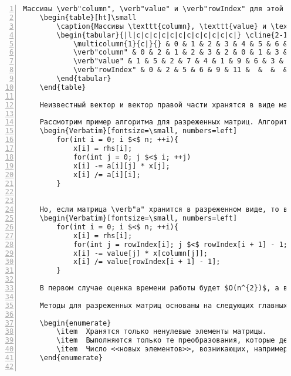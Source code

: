 \documentclass[bachelor, och, pract]{SCWorks}
\begin{document}
\begin{Verbatim}[fontsize=\small, numbers=left]
	Массивы \verb"column", \verb"value" и \verb"rowIndex" для этой матрицы представлены в таблице~\ref{tab:mat-arrays}.
	\begin{table}[ht]\small
		\caption{Массивы \texttt{column}, \texttt{value} и \texttt{rowIndex}}\label{tab:mat-arrays}
		\begin{tabular}{|l|c|c|c|c|c|c|c|c|c|c|c|c|} \cline{2-13}
			\multicolumn{1}{c|}{} & 0 & 1 & 2 & 3 & 4 & 5 & 6 & 7 & 8 & 9 & 10 & 11 \\ \cline{2-13}\hline
			\verb"column" & 0 & 2 & 1 & 2 & 3 & 2 & 0 & 1 & 3 & 2 & 4 &  \\ \hline\hline
			\verb"value" & 1 & 5 & 2 & 7 & 4 & 1 & 9 & 6 & 3 & 3 & 5 &  \\ \hline\hline
			\verb"rowIndex" & 0 & 2 & 5 & 6 & 9 & 11 &  &  &  &  &  &  \\ \hline
		\end{tabular}
	\end{table}
	
	Неизвестный вектор и вектор правой части хранятся в виде массивов размера $n$. Массив неизвестного вектора обозначают \verb"x", а массив правой части "--- \verb"rhs".
	
	Рассмотрим пример алгоритма для разреженных матриц. Алгоритм решения СЛАУ, представленной нижнетреугольной матрицей \verb"a", можно реализовать двумя вложенными циклами по \verb"n":
	\begin{Verbatim}[fontsize=\small, numbers=left]
		for(int i = 0; i $<$ n; ++i){
			x[i] = rhs[i];
			for(int j = 0; j $<$ i; ++j)
			x[i] -= a[i][j] * x[j];
			x[i] /= a[i][i];
		}

	
	Но, если матрица \verb"a" хранится в разреженном виде, то в данном алгоритме можно проходить только по ненулевым элементам \verb"a":
	\begin{Verbatim}[fontsize=\small, numbers=left]
		for(int i = 0; i $<$ n; ++i){
			x[i] = rhs[i];
			for(int j = rowIndex[i]; j $<$ rowIndex[i + 1] - 1; ++j)
			x[i] -= value[j] * x[column[j]];
			x[i] /= value[rowIndex[i + 1] - 1];
		}

	В первом случае оценка времени работы будет $O(n^{2})$, а во втором $O(|A|)$.
	
	Методы для разреженных матриц основаны на следующих главных принципах:
	
	\begin{enumerate}
		\item  Хранятся только ненулевые элементы матрицы.
		\item  Выполняются только те преобразования, которые действительно что"=то изменяют. В примере не имеет смысла вычитать из \verb"x[i]" значение \verb"x[j]*a[i][j]", если \verb"a[i][j]" равно нулю.
		\item  Число <<новых элементов>>, возникающих, например, во время исключения Гаусса, стараются уменьшить путем перестановок строк и столбцов матрицы.
	\end{enumerate}
	

\end{Verbatim}
\end{document}
